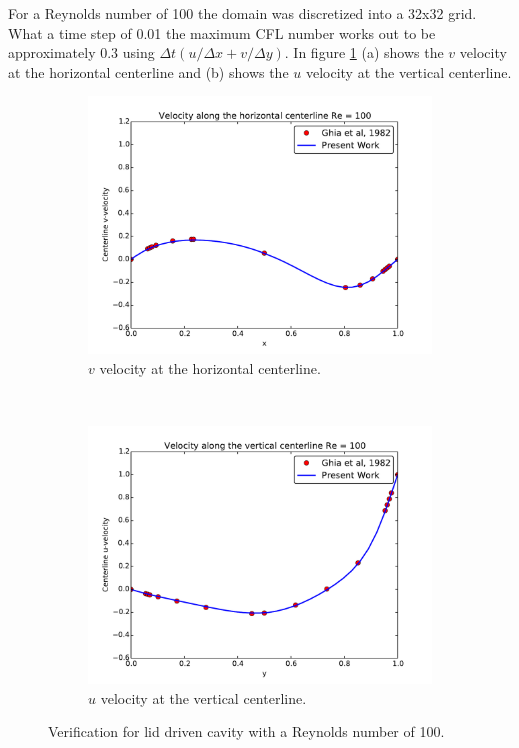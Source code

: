 \documentclass[onehalf,11pt]{beavtex}
\begin{document}
For a Reynolds number of 100 the domain was discretized into a 32x32 grid. 
What a time step of 0.01 the maximum CFL number works out to be approximately 0.3 using $\Delta t(u/\Delta x+v/\Delta y)$.
In figure \ref{fig:ldc100} (a) shows the $v$ velocity at the horizontal centerline and (b) shows the $u$ velocity at the vertical centerline. 
\begin{figure}[h]
	\centering
	\begin{subfigure}{0.4\textwidth}
		\includegraphics[width=\linewidth]{ldc_horizontal_100}
		\caption{$v$ velocity at the horizontal centerline.}		
	\end{subfigure}
	~
	\begin{subfigure}{0.4\textwidth}
		\includegraphics[width=\linewidth]{ldc_vertical_100}
		\caption{$u$ velocity at the vertical centerline.}		
	\end{subfigure}
	\caption{Verification for lid driven cavity with a Reynolds number of 100.}
	\label{fig:ldc100}
\end{figure}
\end{document}
